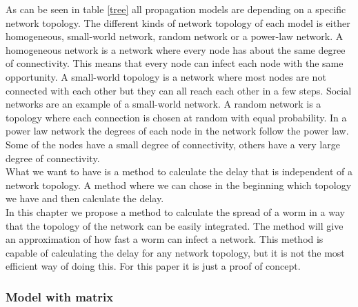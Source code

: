 As can be seen in table \ref{tree} all propagation models are depending on a specific network topology. The different kinds of network topology of each model is either homogeneous, small-world network, random network or a power-law network. A homogeneous network is a network where every node has about the same degree of connectivity. This means that every node can infect each node with the same opportunity. A small-world topology is a network where most nodes are not connected with each other but they can all reach each other in a few steps. Social networks are an example of a small-world network. A random network is a topology where each connection is chosen at random with equal probability. In a power law  network the degrees of each node in the network follow the power law. Some of the nodes have a small degree of connectivity, others have a very large degree of connectivity.\\

What we want to have is a method to calculate the delay that is independent of a network topology. A method where we can chose in the beginning which topology we have and then calculate the delay.\\

In this chapter we propose a method to calculate the spread of a worm in a way that the topology of the network can be easily integrated. The method will give an approximation of how fast a worm can infect a network. This method is capable of calculating the delay for any network topology, but it is not the most efficient way of doing this. For this paper it is just a proof of concept.  


\subsubsection{Model with matrix}


%

